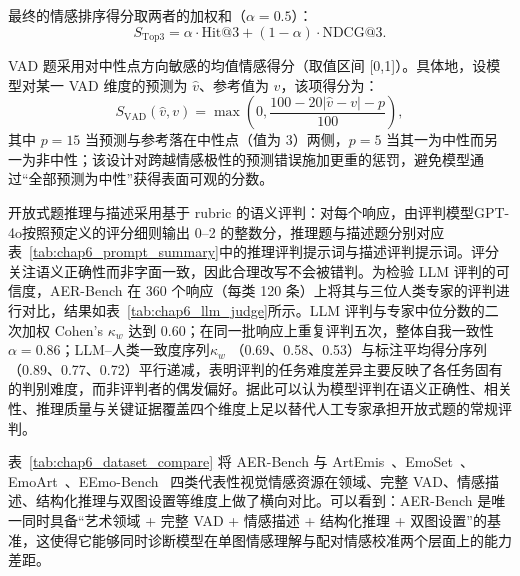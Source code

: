 最终的情感排序得分取两者的加权和（$\alpha=0.5$）：
\begin{equation}
S_{\mathrm{Top3}}=\alpha\cdot\mathrm{Hit@3}+(1-\alpha)\cdot\mathrm{NDCG@3}.
\label{eq:chap6_stop3}
\end{equation}

VAD 题采用对中性点方向敏感的均值情感得分（取值区间 [0,1]）。具体地，设模型对某一 VAD 维度的预测为 $\hat{v}$、参考值为 $v$，该项得分为：
\begin{equation}
S_{\mathrm{VAD}}(\hat{v},v)=\max\left(0,\frac{100-20|\hat{v}-v|-p}{100}\right),
\label{eq:chap6_svad}
\end{equation}
其中 $p=15$ 当预测与参考落在中性点（值为 3）两侧，$p=5$ 当其一为中性而另一为非中性；该设计对跨越情感极性的预测错误施加更重的惩罚，避免模型通过“全部预测为中性”获得表面可观的分数。

开放式题推理与描述采用基于 rubric 的语义评判：对每个响应，由评判模型GPT-4o按照预定义的评分细则输出 0--2 的整数分，推理题与描述题分别对应表~\ref{tab:chap6_prompt_summary}中的推理评判提示词与描述评判提示词。评分关注语义正确性而非字面一致，因此合理改写不会被错判。为检验 LLM 评判的可信度，AER-Bench 在 360 个响应（每类 120 条）上将其与三位人类专家的评判进行对比，结果如表~\ref{tab:chap6_llm_judge}所示。LLM 评判与专家中位分数的二次加权 Cohen's $\kappa_w$ 达到 0.60；在同一批响应上重复评判五次，整体自我一致性 $\alpha=0.86$；LLM--人类一致度序列$\kappa_w$ （0.69、0.58、0.53）与标注平均得分序列（0.89、0.77、0.72）平行递减，表明评判的任务难度差异主要反映了各任务固有的判别难度，而非评判者的偶发偏好。据此可以认为模型评判在语义正确性、相关性、推理质量与关键证据覆盖四个维度上足以替代人工专家承担开放式题的常规评判。

表~\ref{tab:chap6_dataset_compare} 将 AER-Bench 与 ArtEmis~\cite{achlioptas2021artemis}、EmoSet~\cite{yang2023emoset}、EmoArt~\cite{emoart2025}、EEmo-Bench~\cite{eemobench2025} 四类代表性视觉情感资源在领域、完整 VAD、情感描述、结构化推理与双图设置等维度上做了横向对比。可以看到：AER-Bench 是唯一同时具备“艺术领域 + 完整 VAD + 情感描述 + 结构化推理 + 双图设置”的基准，这使得它能够同时诊断模型在单图情感理解与配对情感校准两个层面上的能力差距。

